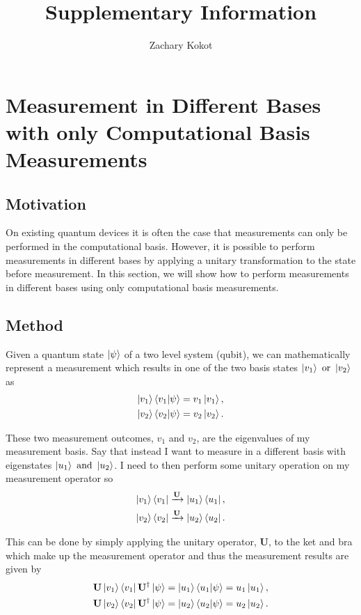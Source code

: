 \documentclass[12pt]{article}
\author{Zachary Kokot}
\title{Supplementary Information}
\begin{document}
    \maketitle

    \tableofcontents

    \newpage

    \section{Measurement in Different Bases with only Computational Basis Measurements}
    \subsection{Motivation}
    On existing quantum devices it is often the case that measurements can only be performed in the computational basis. However, it is possible to perform measurements in different bases by applying a unitary transformation to the state before measurement. In this section, we will show how to perform measurements in different bases using only computational basis measurements.

    \subsection{Method}
    Given a quantum state $\ket{\psi}$ of a two level system (qubit), we can mathematically represent a measurement which results in one of the two basis states $\ket{v_1} \text{ or } \ket{v_2}$ as 
    \begin{align*}
        \ket{v_1} \braket{v_1 | \psi} &= v_1 \ket{v_1}, \\
        \ket{v_2} \braket{v_2 | \psi} &= v_2 \ket{v_2}.
    \end{align*}

    These two measurement outcomes, $v_1$ and $v_2$, are the eigenvalues of my measurement basis. Say that instead I want to measure in a different basis with eigenstates $\ket{u_1} \text{ and } \ket{u_2}$. I need to then perform some unitary operation on my measurement operator so 
    \begin{align*}
        \ket{v_1} \bra{v_1} &\xrightarrow{\mathbf{U}} \ket{u_1} \bra{u_1},\\
        \ket{v_2} \bra{v_2} &\xrightarrow{\mathbf{U}} \ket{u_2} \bra{u_2}.
    \end{align*}

    This can be done by simply applying the unitary operator, $\mathbf{U}$, to the ket and bra which make up the measurement operator and thus the measurement results are given by 
    \begin{align*}
        \mathbf{U} \ket{v_1} \bra{v_1} \mathbf{U}^\dagger \ket{\psi} &= \ket{u_1} \braket{u_1 | \psi} = u_1 \ket{u_1}, \\
        \mathbf{U} \ket{v_2} \bra{v_2} \mathbf{U}^\dagger \ket{\psi} &= \ket{u_2} \braket{u_2 | \psi} = u_2 \ket{u_2}.
    \end{align*}
\end{document}
